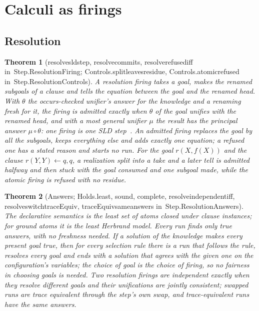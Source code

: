 \documentclass[11pt]{article}
\newtheorem{theorem}{Theorem}
\theoremstyle{remark}
\newcommand{\lean}[1]{{\ttfamily\def\_{\textunderscore\allowbreak}#1}}
\newcommand{\inmod}[1]{in~{\ttfamily\def\_{\textunderscore\allowbreak}#1}}
\begin{document}
\section{Calculi as firings}

\subsection{Resolution}

\begin{theorem}[\lean{resolve\_sld\_step}, \lean{resolve\_commits}, \lean{resolve\_refused\_iff} \inmod{Step.ResolutionFiring}; \lean{Controls.split\_leaves\_residue}, \lean{Controls.atomic\_refused} \inmod{Step.ResolutionControls}]
A resolution firing takes a goal, makes the renamed subgoals of a clause and tells the equation
between the goal and the renamed head. With $\theta$ the occurs-checked unifier's answer for the knowledge
and a renaming fresh for it, the firing is admitted exactly when $\theta$ of the goal unifies with the
renamed head, and with a most general unifier $\mu$ the result has the principal answer $\mu\circ\theta$:
one firing is one SLD step~\cite{robinson65,lloyd87}. An admitted firing replaces the goal by all the
subgoals, keeps everything else and adds exactly one equation; a refused one has a stated reason and
starts no run. For the goal $r(X,f(X))$ and the clause $r(Y,Y)\leftarrow q,q$, a realization split into a
take and a later tell is admitted halfway and then stuck with the goal consumed and one subgoal made,
while the atomic firing is refused with no residue.
\end{theorem}

\begin{theorem}[Answers; \lean{Holds.least}, \lean{sound}, \lean{complete}, \lean{resolve\_independent\_iff}, \lean{resolve\_switch\_traceEquiv}, \lean{traceEquiv\_same\_answers} \inmod{Step.ResolutionAnswers}]
The declarative semantics is the least set of atoms closed under clause instances; for ground atoms it
is the least Herbrand model. Every run finds only true answers, with no freshness needed. If a solution
of the knowledge makes every present goal true, then for every selection rule there is a run that
follows the rule, resolves every goal and ends with a solution that agrees with the given one on the
configuration's variables; the choice of goal is the choice of firing, so no fairness in choosing goals
is needed. Two resolution firings are independent exactly when they resolve different goals and their
unifications are jointly consistent; swapped runs are trace equivalent through the step's own swap, and
trace-equivalent runs have the same answers.
\end{theorem}
\end{document}
